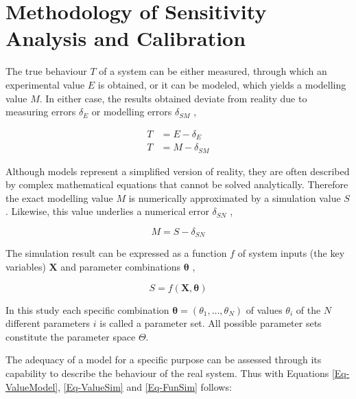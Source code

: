 

\section{Methodology of Sensitivity Analysis and Calibration}
\label{Sec-SAnaCal}

The true behaviour $T$ of a system can be either measured, through which an experimental value $E$ is obtained, or it can be modeled, which yields a modelling value $M$. 
In either case, the results obtained deviate from reality due to measuring errors $\delta_E$ or modelling errors $\delta_{SM}$ \parencite{Stern.2001},

\begin{align}
    T & =  E - \delta_E \label{Eq-ValueEx} \\
    T & =  M - \delta_{SM} \label{Eq-ValueModel}
\end{align}

Although models represent a simplified version of reality, they are often described by complex mathematical equations that cannot be solved analytically. 
Therefore the exact modelling value $M$ is numerically approximated by a simulation value $S$. 
Likewise, this value underlies a numerical error $\delta_{SN}$ \parencite{Stern.2001},

\begin{equation}
    \label{Eq-ValueSim}
    M = S - \delta_{SN}
\end{equation}

The simulation result can be expressed as a function $f$ of system inputs (the key variables) $\bm{X}$ and parameter combinations $\bm{\theta}$ \parencite{Naeini.2019},

\begin{equation}
    \label{Eq-FunSim}
    S = f(\bm{X},\bm{\theta})
\end{equation}

In this study each specific combination $\bm{\theta} = ( \theta_1,\dots,\theta_N)$ of values $\theta_i$ of the $N$ different parameters $i$ is called a parameter set. 
All possible parameter sets constitute the parameter space $\Theta$.

The adequacy of a model for a specific purpose can be assessed through its capability to describe the behaviour of the real system. 
Thus with Equations \eqref{Eq-ValueModel}, \eqref{Eq-ValueSim} and \eqref{Eq-FunSim} follows:

